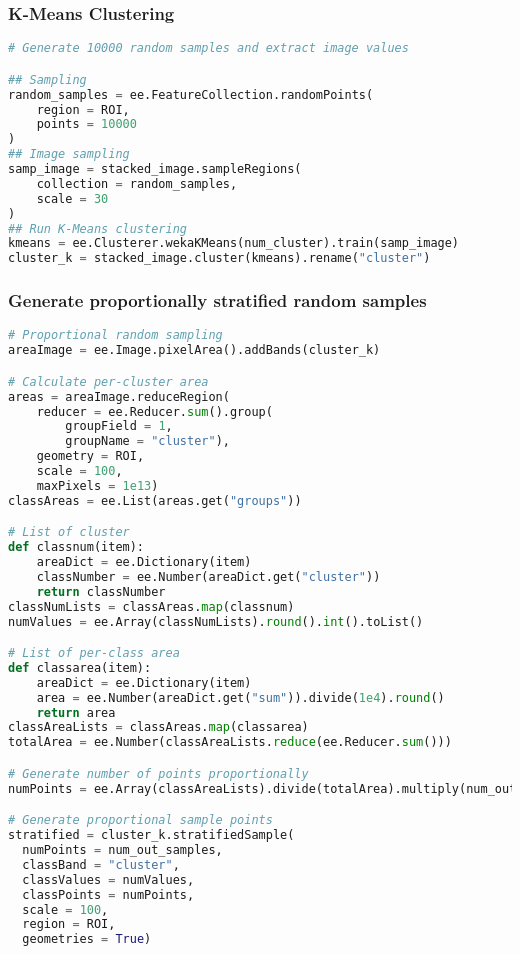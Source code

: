 \hypertarget{k-means-clustering}{%
\subsubsection{K-Means Clustering}\label{k-means-clustering}}

\begin{lstlisting}[language=Python]
# Generate 10000 random samples and extract image values

## Sampling
random_samples = ee.FeatureCollection.randomPoints(
    region = ROI,
    points = 10000
)
## Image sampling
samp_image = stacked_image.sampleRegions(
    collection = random_samples,
    scale = 30
)
## Run K-Means clustering
kmeans = ee.Clusterer.wekaKMeans(num_cluster).train(samp_image)
cluster_k = stacked_image.cluster(kmeans).rename("cluster")
\end{lstlisting}

\hypertarget{generate-proportionally-stratified-random-samples}{%
\subsubsection{Generate proportionally stratified random
samples}\label{generate-proportionally-stratified-random-samples}}

\begin{lstlisting}[language=Python]
# Proportional random sampling
areaImage = ee.Image.pixelArea().addBands(cluster_k)

# Calculate per-cluster area
areas = areaImage.reduceRegion(
    reducer = ee.Reducer.sum().group(
        groupField = 1,
        groupName = "cluster"),
    geometry = ROI,
    scale = 100,
    maxPixels = 1e13)
classAreas = ee.List(areas.get("groups"))

# List of cluster
def classnum(item):
    areaDict = ee.Dictionary(item)
    classNumber = ee.Number(areaDict.get("cluster"))
    return classNumber
classNumLists = classAreas.map(classnum)
numValues = ee.Array(classNumLists).round().int().toList()

# List of per-class area
def classarea(item):
    areaDict = ee.Dictionary(item)
    area = ee.Number(areaDict.get("sum")).divide(1e4).round()
    return area
classAreaLists = classAreas.map(classarea)
totalArea = ee.Number(classAreaLists.reduce(ee.Reducer.sum()))

# Generate number of points proportionally
numPoints = ee.Array(classAreaLists).divide(totalArea).multiply(num_out_samples).round().int().toList()

# Generate proportional sample points
stratified = cluster_k.stratifiedSample(
  numPoints = num_out_samples,
  classBand = "cluster",
  classValues = numValues,
  classPoints = numPoints,
  scale = 100,
  region = ROI,
  geometries = True)
\end{lstlisting}

